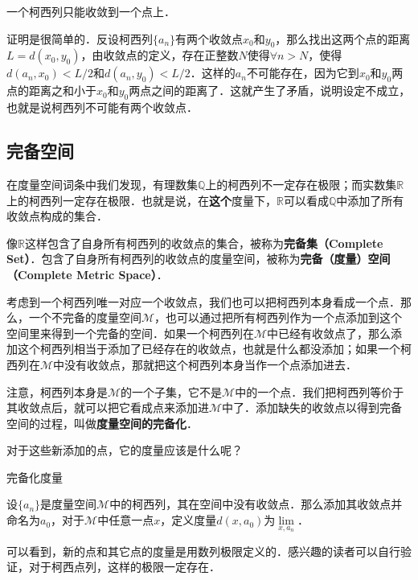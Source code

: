 一个柯西列只能收敛到一个点上．

\begin{theorem}{收敛点的唯一性}

给定度量空间$\mathcal{M}$，如果$\{a_n\}_{n=1}^{\infty$是一个柯西列，那么这个柯西列只收敛到一个点上．

\end{theorem}

证明是很简单的．反设柯西列$\{a_n\}$有两个收敛点$x_0$和$y_0$，那么找出这两个点的距离$L=d(x_0, y_0)$，由收敛点的定义，存在正整数$N$使得$\forall n>N$，使得$d(a_n, x_0)<L/2$和$d(a_n, y_0)<L/2$．这样的$a_n$不可能存在，因为它到$x_0$和$y_0$两点的距离之和小于$x_0$和$y_0$两点之间的距离了．这就产生了矛盾，说明设定不成立，也就是说柯西列不可能有两个收敛点．


\subsection{完备空间}

在度量空间词条中我们发现，有理数集$\mathbb{Q}$上的柯西列不一定存在极限；而实数集$\mathbb{R}$上的柯西列一定存在极限．也就是说，在\textbf{这个}度量下，$\mathbb{R}$可以看成$\mathbb{Q}$中添加了所有收敛点构成的集合．

像$\mathbb{R}$这样包含了自身所有柯西列的收敛点的集合，被称为\textbf{完备集（Complete Set）}．包含了自身所有柯西列的收敛点的度量空间，被称为\textbf{完备（度量）空间（Complete Metric Space）}．

考虑到一个柯西列唯一对应一个收敛点，我们也可以把柯西列本身看成一个点．那么，一个不完备的度量空间$\mathcal{M}$，也可以通过把所有柯西列作为一个点添加到这个空间里来得到一个完备的空间．如果一个柯西列在$\mathcal{M}$中已经有收敛点了，那么添加这个柯西列相当于添加了已经存在的收敛点，也就是什么都没添加；如果一个柯西列在$\mathcal{M}$中没有收敛点，那就把这个柯西列本身当作一个点添加进去．

注意，柯西列本身是$\mathcal{M}$的一个子集，它不是$\mathcal{M}$中的一个点．我们把柯西列等价于其收敛点后，就可以把它看成点来添加进$\mathcal{M}$中了．添加缺失的收敛点以得到完备空间的过程，叫做\textbf{度量空间的完备化}．

对于这些新添加的点，它的度量应该是什么呢？

\begin{definition}{完备化度量}

设$\{a_n\}$是度量空间$\mathcal{M}$中的柯西列，其在空间中没有收敛点．那么添加其收敛点并命名为$a_0$，对于$\mathcal{M}$中任意一点$x$，定义度量$d(x, a_0)$为$\lim\limits_{x, a_n}$．

\end{definition}

可以看到，新的点和其它点的度量是用数列极限定义的．感兴趣的读者可以自行验证，对于柯西点列，这样的极限一定存在．